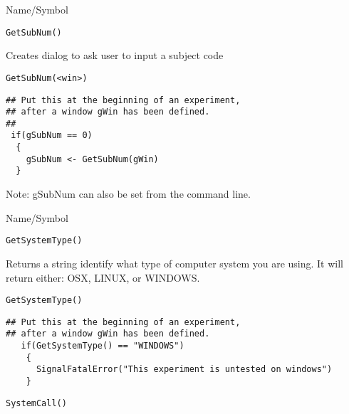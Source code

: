\begin{desc}{Name/Symbol}
\item[Name/Symbol]	\verb+GetSubNum()+

\item[Description]	Creates dialog to ask user to input a subject code

\item[Usage]
\begin{verbatim}
GetSubNum(<win>)
\end{verbatim}

\item[Example]

\begin{verbatim}
## Put this at the beginning of an experiment, 
## after a window gWin has been defined.
##
 if(gSubNum == 0)
  {
    gSubNum <- GetSubNum(gWin)
  }
\end{verbatim}
Note: gSubNum can also be set from the command line.
\item[See Also]
\end{desc}

\rl


\begin{desc}{Name/Symbol}
\item[Name/Symbol]	\verb+GetSystemType()+

\item[Description]	Returns a string identify what type of computer system you are using. It will return either: OSX, LINUX, or WINDOWS.

\item[Usage]
\begin{verbatim}
GetSystemType()
\end{verbatim}

\item[Example]

\begin{verbatim}
## Put this at the beginning of an experiment, 
## after a window gWin has been defined.
   if(GetSystemType() == "WINDOWS")
    {
      SignalFatalError("This experiment is untested on windows")
    }

\end{verbatim}

\item[See Also]
  \verb+SystemCall()+
\end{desc}


\rl


